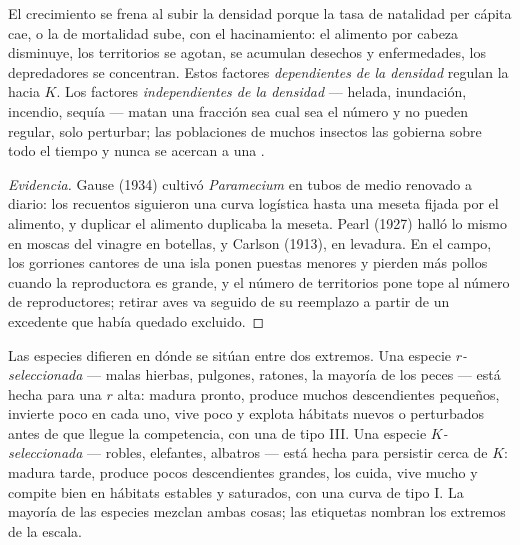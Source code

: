 \begin{proposition}\label{prop:b1:populations:densitydependence}
El crecimiento se frena al subir la densidad porque la tasa de natalidad per
cápita cae, o la de mortalidad sube, con el hacinamiento: el alimento por
cabeza disminuye, los territorios se agotan, se acumulan desechos y
enfermedades, los depredadores se concentran. Estos factores
\emph{dependientes de la densidad} regulan la  hacia $K$. Los
factores \emph{independientes de la densidad} --- helada, inundación,
incendio, sequía --- matan una fracción sea cual sea el número y no pueden
regular, solo perturbar; las poblaciones de muchos insectos las gobierna
sobre todo el tiempo y nunca se acercan a una .
\end{proposition}
\begin{proof}[Evidencia]
Gause (1934) cultivó \emph{Paramecium} en tubos de medio renovado a diario:
los recuentos siguieron una curva logística hasta una meseta fijada por el
alimento, y duplicar el alimento duplicaba la meseta. Pearl (1927) halló lo
mismo en moscas del vinagre en botellas, y Carlson (1913), en levadura. En
el campo, los gorriones cantores de una isla ponen puestas menores y pierden
más pollos cuando la  reproductora es grande, y el número de
territorios pone tope al número de reproductores; retirar aves va seguido de
su reemplazo a partir de un excedente que había quedado excluido.
\end{proof}

\begin{definition}\label{def:b1:populations:rK}
Las especies difieren en dónde se sitúan entre dos extremos. Una especie
\emph{$r$-seleccionada} --- malas hierbas, pulgones, ratones, la mayoría de
los peces --- está hecha para una $r$ alta: madura pronto, produce muchos
descendientes pequeños, invierte poco en cada uno, vive poco y explota
hábitats nuevos o perturbados antes de que llegue la competencia, con una
 de tipo III. Una especie \emph{$K$-seleccionada} --- robles,
elefantes, albatros --- está hecha para persistir cerca de $K$: madura
tarde, produce pocos descendientes grandes, los cuida, vive mucho y compite
bien en hábitats estables y saturados, con una curva de tipo I. La mayoría
de las especies mezclan ambas cosas; las etiquetas nombran los extremos de
la escala.
\end{definition}

